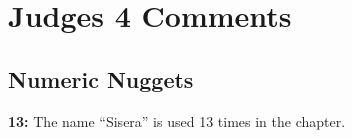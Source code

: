 \section{Judges 4 Comments}

\subsection{Numeric Nuggets}
\textbf{13: } The name ``Sisera'' is used 13 times in the chapter.